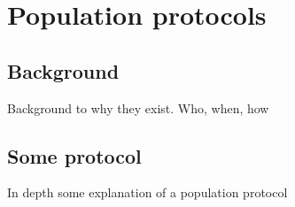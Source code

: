 \section{Population protocols}
\subsection{Background}
Background to why they exist. Who, when, how

\subsection{Some protocol}
In depth some explanation of a population protocol

\clearpage